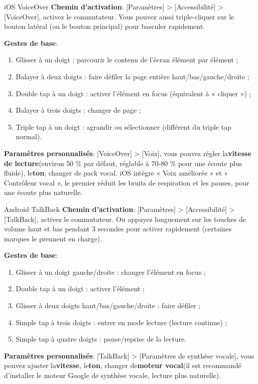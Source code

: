 \begin{tcbinfo}{iOS VoiceOver}
\textbf{Chemin d'activation}: [Paramètres] > [Accessibilité] > [VoiceOver], activez le commutateur. Vous pouvez aussi triple-cliquer sur le bouton latéral (ou le bouton principal) pour basculer rapidement.

\textbf{Gestes de base}:

\begin{enumerate}
  \item Glisser à un doigt : parcourir le contenu de l'écran élément par élément ;
  \item Balayer à deux doigts : faire défiler la page entière haut/bas/gauche/droite ;
  \item Double tap à un doigt : activer l'élément en focus (équivalent à « cliquer ») ;
  \item Balayer à trois doigts : changer de page ;
  \item Triple tap à un doigt : agrandir ou sélectionner (différent du triple tap normal).
\end{enumerate}

\textbf{Paramètres personnalisés}: [VoiceOver] > [Voix], vous pouvez régler la\textbf{vitesse de lecture}(environ 50 \% par défaut, réglable à 70-80 \% pour une écoute plus fluide), le\textbf{ton}, changer de pack vocal. iOS intègre « Voix améliorée » et « Contrôleur vocal », le premier réduit les bruits de respiration et les pauses, pour une écoute plus naturelle.

\end{tcbinfo}

\begin{tcbinfo}{Android TalkBack}
\textbf{Chemin d'activation}: [Paramètres] > [Accessibilité] > [TalkBack], activez le commutateur. Ou appuyez longuement sur les touches de volume haut et bas pendant 3 secondes pour activer rapidement (certaines marques le prennent en charge).

\textbf{Gestes de base}:

\begin{enumerate}
  \item Glisser à un doigt gauche/droite : changer l'élément en focus ;
  \item Double tap à un doigt : activer l'élément ;
  \item Glisser à deux doigts haut/bas/gauche/droite : faire défiler ;
  \item Simple tap à trois doigts : entrer en mode lecture (lecture continue) ;
  \item Simple tap à quatre doigts : pause/reprise de la lecture.
\end{enumerate}

\textbf{Paramètres personnalisés}: [TalkBack] > [Paramètres de synthèse vocale], vous pouvez ajuster la\textbf{vitesse}, le\textbf{ton}, changer de\textbf{moteur vocal}(il est recommandé d'installer le moteur Google de synthèse vocale, lecture plus naturelle).

\end{tcbinfo}

